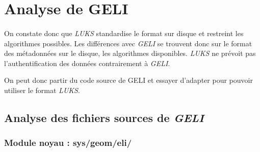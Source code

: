 \section{Analyse de GELI}

\paragraph{}
On constate donc que {\em LUKS} standardise le format sur disque et restreint 
les algorithmes possibles. Les différences avec {\em GELI} se trouvent donc 
sur le format des métadonnées sur le disque, les algorithmes disponibles.
{\em LUKS} ne prévoit pas l'authentification des données 
contrairement à {\em GELI}.

On peut donc partir du code source de GELI et essayer d'adapter pour pouvoir 
utiliser le format {\em LUKS}.

\subsection{Analyse des fichiers sources de \em GELI}
\subsubsection{Module noyau : sys/geom/eli/}

